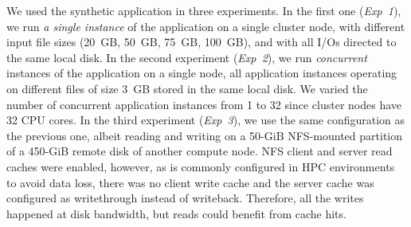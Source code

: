 \documentclass[conference]{IEEEtran}
\begin{document}
        We used the synthetic application in three experiments. In the
        first one (\textit{Exp~1}), we run \emph{a single instance} of
        the application on a single cluster node, with different input file
        sizes (20~GB, 50~GB, 75~GB, 100~GB), and with all I/Os directed to
        the same local disk.
        In the second experiment (\textit{Exp~2}), we run
        \emph{concurrent} instances of the application on a single node,
        all application instances operating on different files of size 3~GB
        stored in the same local disk. We varied the number of concurrent
        application instances from 1 to 32 since cluster nodes have 32 CPU
        cores.
        In the third experiment (\textit{Exp~3}), we use the same
        configuration as the previous one, albeit reading and writing
        on a 50-GiB NFS-mounted partition of a 450-GiB remote disk of
        another compute node. NFS client and server read caches were enabled, however, as is commonly configured in HPC
        environments to avoid data loss, there was no client write cache
        and the server cache was configured as writethrough instead of
        writeback.
        Therefore, all the writes happened at disk bandwidth, but
        reads could benefit from cache hits.
\end{document}
